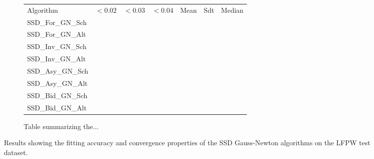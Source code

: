 \begin{figure}[h!]
\begin{subfigure}{0.48\textwidth}
	    \label{fig:mean_cost_vs_iters2_ssd_gn_5}
	\end{subfigure}
	\par\bigskip
	\begin{subfigure}{\textwidth}
		\center
		\begin{tabular}{lcccccc}
		    Algorithm & $<0.02$ & $<0.03$ & $<0.04$ & Mean & Sdt & Median 
		    \\
		    SSD\_For\_GN\_Sch 
		    \\
		    SSD\_For\_GN\_Alt
		    \\
		    SSD\_Inv\_GN\_Sch 
		    \\
		    SSD\_Inv\_GN\_Alt
		    \\
		    SSD\_Asy\_GN\_Sch 
		    \\
		    SSD\_Asy\_GN\_Alt
		    \\
		    SSD\_Bid\_GN\_Sch 
		    \\
		    SSD\_Bid\_GN\_Alt
	  	\end{tabular}
	  	\caption{Table summarizing the...}
	    \label{tab:stats_ssd_gn_5}
	\end{subfigure}
	\label{fig:ssd_gn_5}
	\caption{Results showing the fitting accuracy and convergence properties of the SSD Gauss-Newton algorithms on the LFPW test dataset.}
\end{figure}



